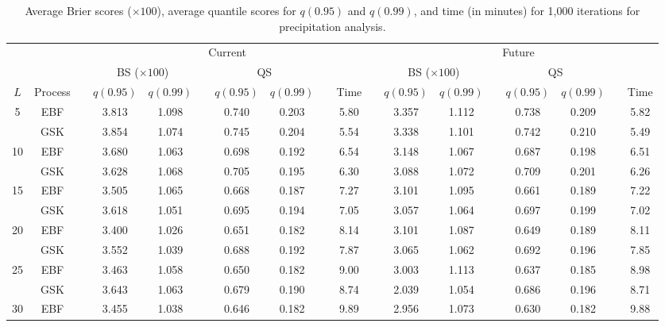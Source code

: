 \documentclass[11pt]{article}
\begin{document}
\begin{landscape}
\begin{table}[htbp]
\caption{Average Brier scores ($\times 100$), average quantile scores for $q(0.95)$ and $q(0.99)$, and time (in minutes) for 1,000 iterations for precipitation analysis.}
\label{ebtbl:precip-scores}
\footnotesize
\centering
  \begin{tabular}{cc c cc c cc c c c cc c cc c c}
  \toprule
  & && \multicolumn{7}{c}{Current} && \multicolumn{7}{c}{Future}  \\
  \cmidrule{4-10} \cmidrule{12-18}
  & && \multicolumn{2}{c}{BS ($\times 100$)} && \multicolumn{2}{c}{QS} && && \multicolumn{2}{c}{BS ($\times 100$)} && \multicolumn{2}{c}{QS} \\
  \cmidrule{4-5} \cmidrule{7-8} \cmidrule{12-13} \cmidrule{15-16}
  $L$ & Process & \phantom{a} & $q(0.95)$ & $q(0.99)$ & \phantom{a} & $q(0.95)$ & $q(0.99)$ & \phantom{a} & Time & \phantom{abc} & $q(0.95)$ & $q(0.99)$ & \phantom{a} & $q(0.95)$ & $q(0.99)$ & \phantom{a} &  Time \\
  \midrule
  5  & EBF && 3.813 & 1.098 && 0.740 & 0.203 && 5.80 && 3.357 & 1.112 && 0.738 & 0.209 && 5.82\\
         & GSK && 3.854 & 1.074 && 0.745 & 0.204 && 5.54 && 3.338 & 1.101 && 0.742 & 0.210 && 5.49\\
  \midrule
  10 & EBF && 3.680 & 1.063 && 0.698 & 0.192 && 6.54 && 3.148 & 1.067 && 0.687 & 0.198 && 6.51\\
         & GSK && 3.628 & 1.068 && 0.705 & 0.195 && 6.30 && 3.088 & 1.072 && 0.709 & 0.201 && 6.26\\
  \midrule
  15 & EBF && 3.505 & 1.065 && 0.668 & 0.187 && 7.27 && 3.101 & 1.095 && 0.661 & 0.189 && 7.22\\
         & GSK && 3.618 & 1.051 && 0.695 & 0.194 && 7.05 && 3.057 & 1.064 && 0.697 & 0.199 && 7.02\\
  \midrule
  20 & EBF && 3.400 & 1.026 && 0.651 & 0.182 && 8.14 && 3.101 & 1.087 && 0.649 & 0.189 && 8.11\\
         & GSK && 3.552 & 1.039 && 0.688 & 0.192 && 7.87 && 3.065 & 1.062 && 0.692 & 0.196 && 7.85\\
  \midrule
  25 & EBF && 3.463 & 1.058 && 0.650 & 0.182 && 9.00 && 3.003 & 1.113 && 0.637 & 0.185 && 8.98\\
         & GSK && 3.643 & 1.063 && 0.679 & 0.190 && 8.74 && 2.039 & 1.054 && 0.686 & 0.196 && 8.71\\
  \midrule
  30 & EBF && 3.455 & 1.038 && 0.646 & 0.182 && 9.89 && 2.956 & 1.073 && 0.630 & 0.182 && 9.88\\

\end{tabular}
\end{table}
\end{landscape}
\end{document}
